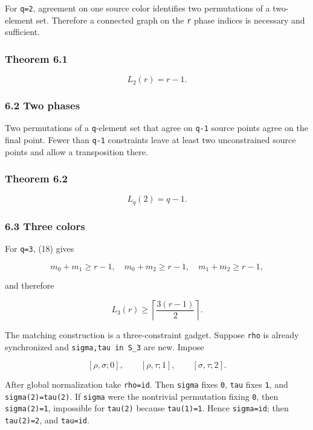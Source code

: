 For \texttt{q=2}, agreement on one source color identifies two
permutations of a two-element set. Therefore a connected graph on the
\texttt{r} phase indices is necessary and sufficient.

\hypertarget{theorem-6.1}{%
\subsubsection{Theorem 6.1}\label{theorem-6.1}}

\[
\boxed{L_2(r)=r-1.}
\tag{20}
\]

\hypertarget{two-phases}{%
\subsubsection{6.2 Two phases}\label{two-phases}}

Two permutations of a \texttt{q}-element set that agree on \texttt{q-1}
source points agree on the final point. Fewer than \texttt{q-1}
constraints leave at least two unconstrained source points and allow a
transposition there.

\hypertarget{theorem-6.2}{%
\subsubsection{Theorem 6.2}\label{theorem-6.2}}

\[
\boxed{L_q(2)=q-1.}
\tag{21}
\]

\hypertarget{three-colors}{%
\subsubsection{6.3 Three colors}\label{three-colors}}

For \texttt{q=3}, (18) gives

\[
m_0+m_1\ge r-1,
\quad
m_0+m_2\ge r-1,
\quad
m_1+m_2\ge r-1,
\]

and therefore

\[
L_3(r)\ge\left\lceil\frac{3(r-1)}2\right\rceil.
\tag{22}
\]

The matching construction is a three-constraint gadget. Suppose
\texttt{rho} is already synchronized and \texttt{sigma,tau\ in\ S\_3}
are new. Impose

\[
[\rho,\sigma;0],
\qquad
[\rho,\tau;1],
\qquad
[\sigma,\tau;2].
\tag{23}
\]

After global normalization take \texttt{rho=id}. Then \texttt{sigma}
fixes \texttt{0}, \texttt{tau} fixes \texttt{1}, and
\texttt{sigma(2)=tau(2)}. If \texttt{sigma} were the nontrivial
permutation fixing \texttt{0}, then \texttt{sigma(2)=1}, impossible for
\texttt{tau(2)} because \texttt{tau(1)=1}. Hence \texttt{sigma=id}; then
\texttt{tau(2)=2}, and \texttt{tau=id}.

